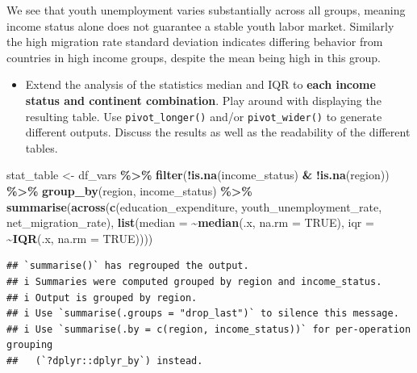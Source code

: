 \documentclass[
]{article}
\newenvironment{Shaded}{\begin{snugshade}}{\end{snugshade}}
\newcommand{\AttributeTok}[1]{\textcolor[rgb]{0.13,0.29,0.53}{#1}}
\newcommand{\ConstantTok}[1]{\textcolor[rgb]{0.56,0.35,0.01}{#1}}
\newcommand{\FunctionTok}[1]{\textcolor[rgb]{0.13,0.29,0.53}{\textbf{#1}}}
\newcommand{\NormalTok}[1]{#1}
\newcommand{\OtherTok}[1]{\textcolor[rgb]{0.56,0.35,0.01}{#1}}
\newcommand{\SpecialCharTok}[1]{\textcolor[rgb]{0.81,0.36,0.00}{\textbf{#1}}}
\providecommand{\tightlist}{%
  \setlength{\itemsep}{0pt}\setlength{\parskip}{0pt}}
\begin{document}
We see that youth unemployment varies substantially across all groups,
meaning income status alone does not guarantee a stable youth labor
market. Similarly the high migration rate standard deviation indicates
differing behavior from countries in high income groups, despite the
mean being high in this group.

\begin{itemize}
\tightlist
\item
  Extend the analysis of the statistics median and IQR to \textbf{each
  income status and continent combination}. Play around with displaying
  the resulting table. Use \texttt{pivot\_longer()} and/or
  \texttt{pivot\_wider()} to generate different outputs. Discuss the
  results as well as the readability of the different tables.
\end{itemize}

\begin{Shaded}
\begin{Highlighting}[]
\NormalTok{stat\_table }\OtherTok{\textless{}{-}}\NormalTok{ df\_vars }\SpecialCharTok{\%\textgreater{}\%}
  \FunctionTok{filter}\NormalTok{(}\SpecialCharTok{!}\FunctionTok{is.na}\NormalTok{(income\_status) }\SpecialCharTok{\&} \SpecialCharTok{!}\FunctionTok{is.na}\NormalTok{(region)) }\SpecialCharTok{\%\textgreater{}\%}
  \FunctionTok{group\_by}\NormalTok{(region, income\_status) }\SpecialCharTok{\%\textgreater{}\%}
  \FunctionTok{summarise}\NormalTok{(}\FunctionTok{across}\NormalTok{(}\FunctionTok{c}\NormalTok{(education\_expenditure, youth\_unemployment\_rate, net\_migration\_rate),}
                   \FunctionTok{list}\NormalTok{(}\AttributeTok{median =} \SpecialCharTok{\textasciitilde{}}\FunctionTok{median}\NormalTok{(.x, }\AttributeTok{na.rm =} \ConstantTok{TRUE}\NormalTok{), }
                        \AttributeTok{iqr =} \SpecialCharTok{\textasciitilde{}}\FunctionTok{IQR}\NormalTok{(.x, }\AttributeTok{na.rm =} \ConstantTok{TRUE}\NormalTok{))))}
\end{Highlighting}
\end{Shaded}

\begin{verbatim}
## `summarise()` has regrouped the output.
## i Summaries were computed grouped by region and income_status.
## i Output is grouped by region.
## i Use `summarise(.groups = "drop_last")` to silence this message.
## i Use `summarise(.by = c(region, income_status))` for per-operation grouping
##   (`?dplyr::dplyr_by`) instead.
\end{verbatim}
\end{document}
